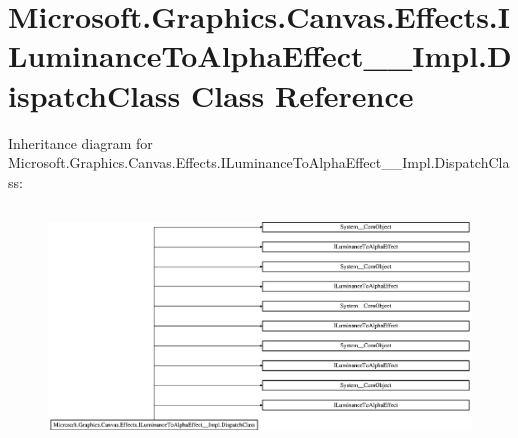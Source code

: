 \hypertarget{class_microsoft_1_1_graphics_1_1_canvas_1_1_effects_1_1_i_luminance_to_alpha_effect_____impl_1_1_dispatch_class}{}\section{Microsoft.\+Graphics.\+Canvas.\+Effects.\+I\+Luminance\+To\+Alpha\+Effect\+\_\+\+\_\+\+Impl.\+Dispatch\+Class Class Reference}
\label{class_microsoft_1_1_graphics_1_1_canvas_1_1_effects_1_1_i_luminance_to_alpha_effect_____impl_1_1_dispatch_class}
Inheritance diagram for Microsoft.\+Graphics.\+Canvas.\+Effects.\+I\+Luminance\+To\+Alpha\+Effect\+\_\+\+\_\+\+Impl.\+Dispatch\+Class\+:\begin{figure}[H]
\begin{center}
\leavevmode
\includegraphics[height=6.337449cm]{class_microsoft_1_1_graphics_1_1_canvas_1_1_effects_1_1_i_luminance_to_alpha_effect_____impl_1_1_dispatch_class}
\end{center}
\end{figure}
